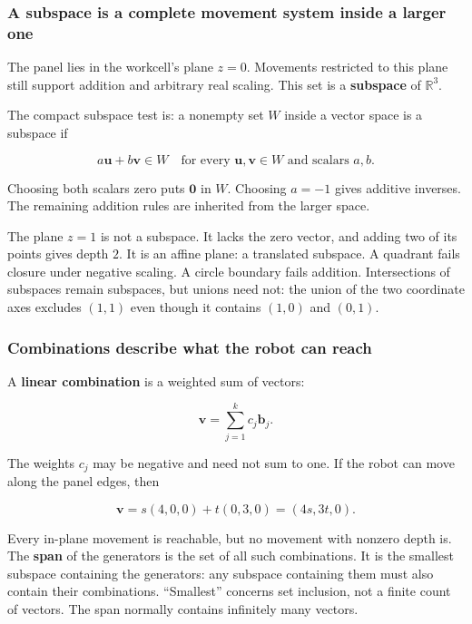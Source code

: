 \subsubsection{A subspace is a complete movement system inside a larger one}\label{01-foundations-i-ch017-a-subspace-is-a-complete-movement-system-inside-a-larger-one}

The panel lies in the workcell's plane \(z=0\). Movements restricted to this plane still support addition and arbitrary real scaling. This set is a \textbf{subspace} of \(\mathbb R^3\).

The compact subspace test is: a nonempty set \(W\) inside a vector space is a subspace if

\[
a\mathbf u+b\mathbf v\in W
\quad\text{for every }\mathbf u,\mathbf v\in W
\text{ and scalars }a,b.
\]

Choosing both scalars zero puts \(\mathbf0\) in \(W\). Choosing \(a=-1\) gives additive inverses. The remaining addition rules are inherited from the larger space.

The plane \(z=1\) is not a subspace. It lacks the zero vector, and adding two of its points gives depth \(2\). It is an affine plane: a translated subspace. A quadrant fails closure under negative scaling. A circle boundary fails addition. Intersections of subspaces remain subspaces, but unions need not: the union of the two coordinate axes excludes \((1,1)\) even though it contains \((1,0)\) and \((0,1)\).

\subsubsection{Combinations describe what the robot can reach}\label{01-foundations-i-ch017-combinations-describe-what-the-robot-can-reach}

A \textbf{linear combination} is a weighted sum of vectors:

\[
\mathbf v=\sum_{j=1}^{k}c_j\mathbf b_j.
\]

The weights \(c_j\) may be negative and need not sum to one. If the robot can move along the panel edges, then

\[
\mathbf v=s(4,0,0)+t(0,3,0)=(4s,3t,0).
\]

Every in-plane movement is reachable, but no movement with nonzero depth is. The \textbf{span} of the generators is the set of all such combinations. It is the smallest subspace containing the generators: any subspace containing them must also contain their combinations. ``Smallest'' concerns set inclusion, not a finite count of vectors. The span normally contains infinitely many vectors.

